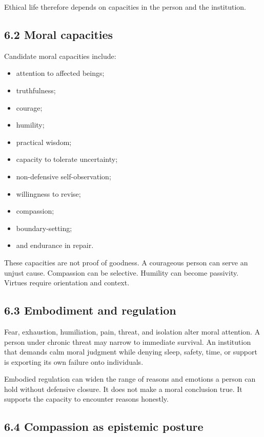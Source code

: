 \documentclass[
  11pt,
]{article}
\providecommand{\tightlist}{%
  \setlength{\itemsep}{0pt}\setlength{\parskip}{0pt}}
\begin{document}
Ethical life therefore depends on capacities in the person and the
institution.

\subsection{6.2 Moral capacities}\label{moral-capacities}

Candidate moral capacities include:

\begin{itemize}
\tightlist
\item
  attention to affected beings;
\item
  truthfulness;
\item
  courage;
\item
  humility;
\item
  practical wisdom;
\item
  capacity to tolerate uncertainty;
\item
  non-defensive self-observation;
\item
  willingness to revise;
\item
  compassion;
\item
  boundary-setting;
\item
  and endurance in repair.
\end{itemize}

These capacities are not proof of goodness. A courageous person can
serve an unjust cause. Compassion can be selective. Humility can become
passivity. Virtues require orientation and context.

\subsection{6.3 Embodiment and
regulation}\label{embodiment-and-regulation}

Fear, exhaustion, humiliation, pain, threat, and isolation alter moral
attention. A person under chronic threat may narrow to immediate
survival. An institution that demands calm moral judgment while denying
sleep, safety, time, or support is exporting its own failure onto
individuals.

Embodied regulation can widen the range of reasons and emotions a person
can hold without defensive closure. It does not make a moral conclusion
true. It supports the capacity to encounter reasons honestly.

\subsection{6.4 Compassion as epistemic
posture}\label{compassion-as-epistemic-posture}
\end{document}
